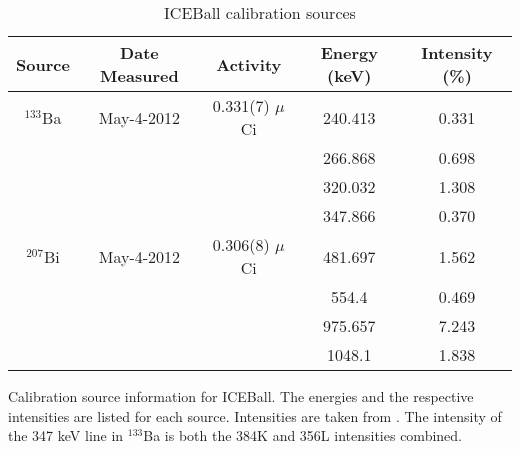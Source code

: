 \begin{table}[]
    \centering
    \caption{ICEBall calibration sources}
    \begin{tabular}{c|c|c|c|c} \toprule
         Source & Date Measured & Activity & Energy (keV) & Intensity (\%)\\
          \hline 
         $^{133}$Ba & May-4-2012 & 0.331(7) $\mu$Ci & 240.413 & 0.331 \\
         & & & 266.868 & 0.698 \\
         & & & 320.032 & 1.308 \\
         & & & 347.866 & 0.370 \\
         \hline
         $^{207}$Bi & May-4-2012 & 0.306(8) $\mu$Ci & 481.697 & 1.562 \\ 
         & & & 554.4 & 0.469 \\
         & & & 975.657 & 7.243 \\
         & & & 1048.1 & 1.838 \\\bottomrule
    \end{tabular}
    \footnotesize
    \item Calibration source information for ICEBall. The energies and the respective intensities are listed for each source. Intensities are taken from \cite{trzaska90:_calibration}. The intensity of the 347 keV line in $^{133}$Ba is both the 384K and 356L intensities combined.
    \label{tab:ICE_Cal_Source}
\end{table}